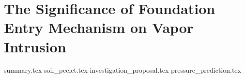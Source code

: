 \documentclass[../thesis.tex]{subfiles}
\begin{document}
\chapter{The Significance of Foundation Entry Mechanism on Vapor Intrusion}\label{chp:transport_implications}


{summary.tex}
{soil_peclet.tex}
{investigation_proposal.tex}
{pressure_prediction.tex}
\end{document}
